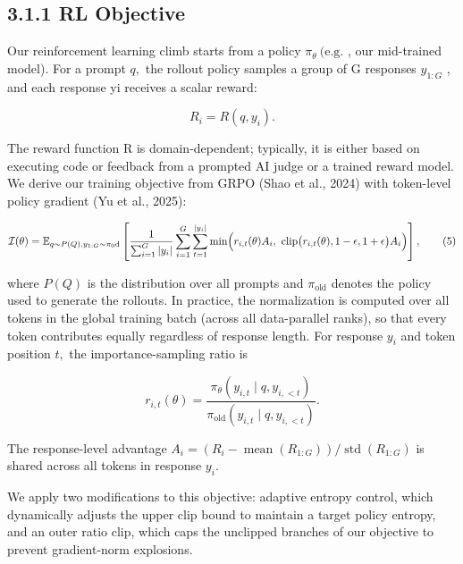 \documentclass[
  10
]{article}
\begin{document}
\subsection{3.1.1 RL Objective}\label{rl-objective}

Our reinforcement learning climb starts from a policy
\(\pi _ { \theta } \ ( \mathrm { e . g . }\) , our mid-trained model).
For a prompt \(q ,\) the rollout policy samples a group of G responses
\(y _ { 1 : G }\) , and each response yi receives a scalar reward:

\[
R _ { i } = R ( q , y _ { i } ) .\tag{4}
\]

The reward function R is domain-dependent; typically, it is either based
on executing code or feedback from a prompted AI judge or a trained
reward model. We derive our training objective from GRPO (Shao et al.,
2024) with token-level policy gradient (Yu et al., 2025):

\[
\mathcal { I } ( \theta ) = \mathbb { E } _ { q \sim P ( Q ) , y _ { 1 : G } \sim \pi _ { 0 } \mathrm { d } } \left[ \frac { 1 } { \sum _ { i = 1 } ^ { G } | y _ { i } | } \sum _ { i = 1 } ^ { G } \sum _ { t = 1 } ^ { | y _ { i } | } \operatorname* { m i n } \Bigl ( r _ { i , t } ( \theta ) A _ { i } , \ \mathrm { c l i p } \bigl ( r _ { i , t } ( \theta ) , 1 - \epsilon , 1 + \epsilon \bigr ) A _ { i } \Bigr ) \right] ,\tag{5}
\]

where \(P ( Q )\) is the distribution over all prompts and
\(\pi _ { \mathrm { o l d } }\) denotes the policy used to generate the
rollouts. In practice, the normalization is computed over all tokens in
the global training batch (across all data-parallel ranks), so that
every token contributes equally regardless of response length. For
response \(y _ { i }\) and token position \(t ,\) the
importance-sampling ratio is

\[
r _ { i , t } ( \theta ) = \frac { \pi _ { \theta } ( y _ { i , t } \mid q , y _ { i , < t } ) } { \pi _ { \mathrm { o l d } } ( y _ { i , t } \mid q , y _ { i , < t } ) } .\tag{6}
\]

The response-level advantage
\(A _ { i } = \left( R _ { i } - \operatorname* { m e a n } ( R _ { 1 : G } ) \right) / \operatorname { s t d } ( R _ { 1 : G } )\)
is shared across all tokens in response \(y _ { i } .\)

We apply two modifications to this objective: adaptive entropy control,
which dynamically adjusts the upper clip bound to maintain a target
policy entropy, and an outer ratio clip, which caps the unclipped
branches of our objective to prevent gradient-norm explosions.
\end{document}
